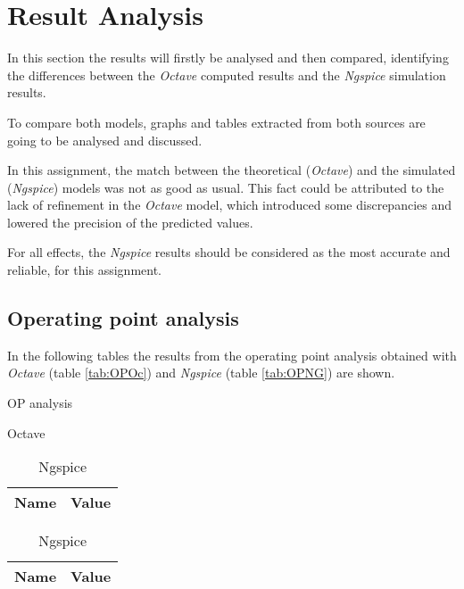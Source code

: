 \section{Result Analysis}
\label{sec:ResultAnalysis}


\indent

In this section the results will firstly be analysed and then compared, identifying the differences between the {\it Octave} computed results and the {\it Ngspice} simulation results. 

To compare both models, graphs and tables extracted from both sources are going to be analysed and discussed.

In this assignment, the match between the theoretical ({\it Octave}) and the simulated ({\it Ngspice}) models was not as good as usual. This fact could be attributed to the lack of refinement in the {\it Octave} model, which introduced some discrepancies and lowered the precision of the predicted values. 

For all effects, the {\it Ngspice} results should be considered as the most accurate and reliable, for this assignment. 

\subsection{Operating point analysis}

In the following tables the results from the operating point analysis obtained with \textit{Octave} (table \ref{tab:OPOc}) and \textit{Ngspice} (table \ref{tab:OPNG}) are shown.

\begin{table}[H]
    \caption{OP analysis}
    \begin{subtable}{.5\linewidth}
      \centering
        \caption{Octave}
        \begin{tabular}{ll}
        \hline    
        {\bf Name} & {\bf Value} \\ \hline
        
        \end{tabular}
        \label{tab:OPOc}
    \end{subtable}%
    \begin{subtable}{.5\linewidth}
      \centering
        \caption{Ngspice}
        \begin{tabular}{ll}
        \hline    
        {\bf Name} & {\bf Value} \\ \hline
        
        \end{tabular}
        \label{tab:OPNG}
    \end{subtable} 
    \label{tab:OP}
\end{table}
\indent

